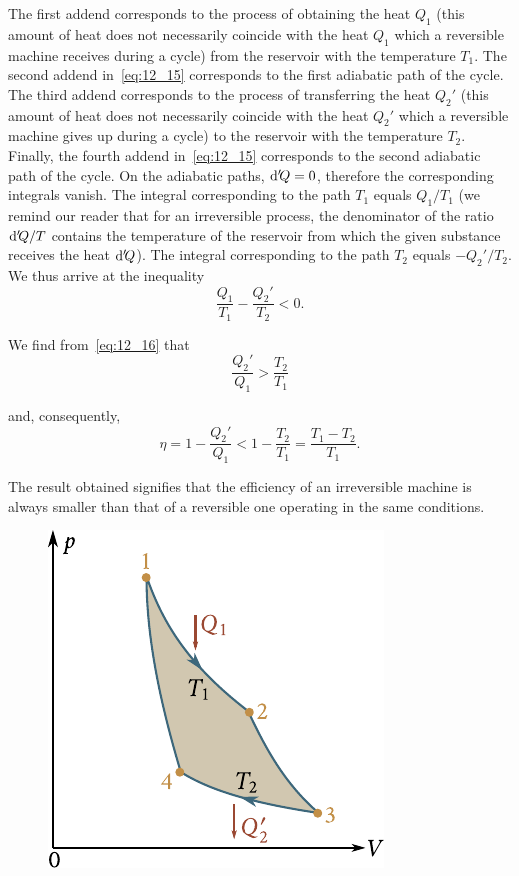 \noindent
The first addend corresponds to the process of obtaining the heat $Q_1$ (this amount of heat does not necessarily coincide with the heat $Q_1$ which a reversible machine receives during a cycle) from the reservoir with the temperature $T_1$. The second addend in~\eqref{eq:12_15} corresponds to the first adiabatic path of the cycle. The third addend corresponds to the process of transferring the heat $Q_2'$ (this amount of heat does not necessarily coincide with the heat $Q_2'$ which a reversible machine gives up during a cycle) to the reservoir with the temperature $T_2$. Finally, the fourth addend in~\eqref{eq:12_15} corresponds to the second adiabatic path of the cycle. On the adiabatic paths, $\mathrm{d}'\!Q=0$, therefore the corresponding integrals vanish. The integral corresponding to the path $T_1$ equals $Q_1/T_1$ (we remind our reader that for an irreversible process, the denominator of the ratio $\mathrm{d}'\!Q/T$ contains the temperature of the reservoir from which the given substance receives the heat $\mathrm{d}'\!Q$). The integral corresponding to the path $T_2$ equals $-Q_2'/T_2$. We thus arrive at the inequality
\begin{equation}\label{eq:12_16}
	\frac{Q_1}{T_1} - \frac{Q_2'}{T_2}  < 0.
\end{equation}

\noindent
We find from~\eqref{eq:12_16} that
\begin{equation*}
	\frac{Q_2'}{Q_1} > \frac{T_2}{T_1}
\end{equation*}

\noindent
and, consequently,
\begin{equation}\label{eq:12_17}
	\eta = 1 - \frac{Q_2'}{Q_1} < 1 - \frac{T_2}{T_1} = \frac{T_1 - T_2}{T_1}.
\end{equation}

\noindent
The result obtained signifies that the efficiency of an irreversible machine is always smaller than that of a reversible one operating in the same conditions.

\begin{figure}[t]
	\begin{center}
		\includegraphics[scale=1.0]{figures/ch_12/fig_12_4.pdf}
		\caption[]{}
		\label{fig:12_4}
	\end{center}
	\vspace{-0.8cm}
\end{figure}

